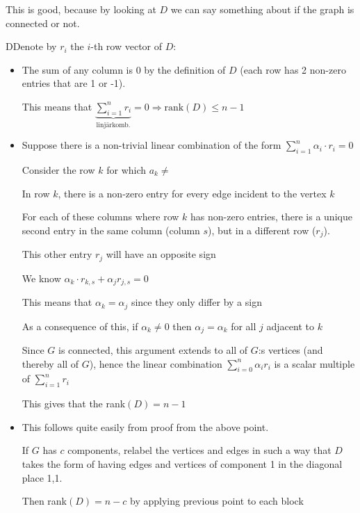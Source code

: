 \par\bigskip
\noindent This is good, because by looking at $D$ we can say something about if the graph is connected or not.
\par\bigskip
\begin{prf}
  DDenote by $r_i$ the $i$-th row vector of $D$:\par
  \begin{itemize}
    \item The sum of any column is 0 by the definition of $D$ (each row has 2 non-zero entries that are 1 or -1).\par
      This means that $\underbrace{\sum_{i=1}^{n}r_i}_{\text{linjärkomb.}} = 0\Rightarrow\text{rank}(D) \leq n-1$
      \par\bigskip
    \item Suppose there is a non-trivial linear combination of the form $\sum_{i=1}^{n}\alpha_i\cdot r_i = 0$ \par
      Consider the row $k$ for which $a_k\neq$\par
      In row $k$, there is a non-zero entry for every edge incident to the vertex $k$ \par
      For each of these columns where row $k$ has non-zero entries, there is a unique second entry in the same column (column $s$), but in a different row ($r_j$).\par
      This other entry $r_j$ will have an opposite sign\par
      We know $\alpha_k\cdot r_{k,s}+\alpha_jr_{j,s} = 0$\par
      This means that $\alpha_k = \alpha_j$ since they only differ by a sign
      \par\bigskip
      As a consequence of this, if $\alpha_k\neq0$ then $\alpha_j=\alpha_k$ for all $j$ adjacent to $k$\par
      Since $G$ is connected, this argument extends to all of $G$:s vertices (and thereby all of $G$), hence the linear combination $\sum_{i=0}^{n}\alpha_ir_i$ is a scalar multiple of $\sum_{i=1}^{n}r_i$
      \par\bigskip
      This gives that the rank$(D) = n-1$
      \par\bigskip
    \item This follows quite easily from proof from the above point.\par
      If $G$ has $c$ components, relabel the vertices and edges in such a way that $D$ takes the form of having edges and vertices of component 1 in the diagonal place 1,1.\par
       Then rank$(D) = n-c$ by applying previous point to each block
  \end{itemize}
  \par\bigskip
\end{prf}
